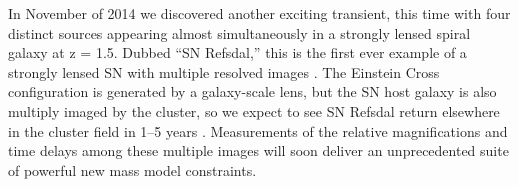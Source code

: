In November of 2014 we discovered another exciting transient, this time with four distinct sources appearing almost simultaneously in a strongly lensed spiral galaxy at z = 1.5. Dubbed “SN Refsdal,” this is the first ever example of a strongly lensed SN with multiple resolved images \citep[][Figure 3]{Kelly2014}. The Einstein Cross configuration is generated by a galaxy-scale lens, but the SN host galaxy is also multiply imaged by the cluster, so we expect to see SN Refsdal return elsewhere in the cluster field in 1–5 years \citep{Oguri2015, Sharon2015}. Measurements of the relative magnifications and time delays among these multiple images will soon deliver an unprecedented suite of powerful new mass model constraints.



